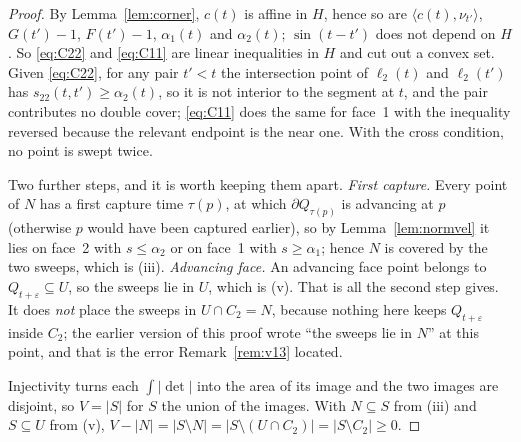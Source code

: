 \documentclass[11pt]{article}
\theoremstyle{definition}
\begin{document}
\begin{proof}
By Lemma~\ref{lem:corner}, $c(t)$ is affine in $H$, hence so are
$\langle c(t),\nu_{t'}\rangle$, $G(t')-1$, $F(t')-1$, $\alpha_1(t)$ and $\alpha_2(t)$;
$\sin(t-t')$ does not depend on $H$. So \eqref{eq:C22} and \eqref{eq:C11} are linear
inequalities in $H$ and cut out a convex set. Given \eqref{eq:C22}, for any pair
$t'<t$ the intersection point of $\ell_2(t)$ and $\ell_2(t')$ has
$s_{22}(t,t')\ge\alpha_2(t)$, so it is not interior to the segment at $t$, and the pair
contributes no double cover; \eqref{eq:C11} does the same for face~1 with the inequality
reversed because the relevant endpoint is the near one. With the cross condition, no point
is swept twice.

Two further steps, and it is worth keeping them apart. \emph{First capture.} Every point of
$N$ has a first capture time $\tau(p)$, at which $\partial Q_{\tau(p)}$ is advancing at $p$
(otherwise $p$ would have been captured earlier), so by Lemma~\ref{lem:normvel} it lies on
face~2 with $s\le\alpha_2$ or on face~1 with $s\ge\alpha_1$; hence $N$ is covered by the two
sweeps, which is (iii). \emph{Advancing face.} An advancing face point belongs to
$Q_{t+\varepsilon}\subseteq U$, so the sweeps lie in $U$, which is (v). That is all the
second step gives. It does \emph{not} place the sweeps in $U\cap C_2=N$, because nothing here
keeps $Q_{t+\varepsilon}$ inside $C_2$; the earlier version of this proof wrote ``the sweeps
lie in $N$'' at this point, and that is the error Remark~\ref{rem:v13} located.

Injectivity turns each $\int|\det|$ into the area of its image and the two images are
disjoint, so $V=|S|$ for $S$ the union of the images. With $N\subseteq S$ from (iii) and
$S\subseteq U$ from (v), $V-|N|=|S\setminus N|=|S\setminus(U\cap C_2)|=|S\setminus C_2|\ge0$.
\end{proof}
\end{document}
